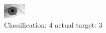 \begin{figure}[h!]
\begin{center}
\includegraphics[width=0.60\columnwidth]{figures/ID2192_class_4_target_3.png}
\end{center}
\caption{ Classification: 4 actual target: 3}
\label{fig:ID2192_class_4_target_3}
\end{figure}
